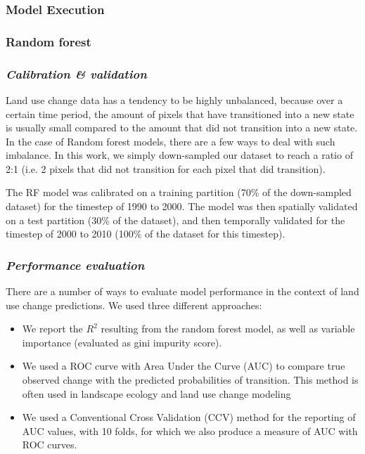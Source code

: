 \subsubsection{Model Execution}

\subsubsection*{Random forest}

\subsubsection*{\textit{Calibration \& validation}}

Land use change data has a tendency to be highly unbalanced, because over a certain time period, the amount of pixels that have transitioned into a new state is usually small compared to the amount that did not transition into a new state. In the case of Random forest models, there are a few ways to deal with such imbalance. In this work, we simply down-sampled our dataset to reach a ratio of 2:1 (i.e. 2 pixels that did not transition for each pixel that did transition).

The RF model was calibrated on a training partition (70\% of the down-sampled dataset) for the timestep of 1990 to 2000. The model was then spatially validated on a test partition (30\% of the dataset), and then temporally validated for the timestep of 2000 to 2010 (100\% of the dataset for this timestep). \\

\subsubsection*{\textit{Performance evaluation}}

There are a number of ways to evaluate model performance in the context of land use change predictions. We used three different approaches:
\begin{itemize}
\item We report the $R^{2}$ resulting from the random forest model, as well as variable importance (evaluated as gini impurity score).
\item We used a ROC curve with Area Under the Curve (AUC) to compare true observed change with the predicted probabilities of transition. This method is often used in landscape ecology and land use change modeling \citep{pontius_recommendations_2014}
\item We used a Conventional Cross Validation (CCV) method for the reporting of AUC values, with 10 folds, for which we also produce a measure of AUC with ROC curves.\\
\end{itemize}

